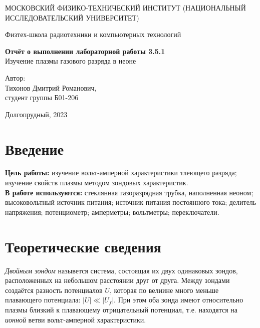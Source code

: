 \documentclass[a4paper, 12pt]{article}
\begin{document}
    \begin{titlepage}
	\begin{center}
            {\large МОСКОВСКИЙ ФИЗИКО-ТЕХНИЧЕСКИЙ ИНСТИТУТ (НАЦИОНАЛЬНЫЙ ИССЛЕДОВАТЕЛЬСКИЙ УНИВЕРСИТЕТ)}
	\end{center}
 
	\begin{center}
		{\large Физтех-школа радиотехники и компьютерных технологий}
	\end{center}
	
	\vspace{8cm}
	{\LARGE
		\begin{center}
                {\bf Отчёт о выполнении лабораторной работы 3.5.1}\\
                Изучение плазмы газового разряда в неоне
		\end{center}
	}
	\vspace{5cm}
	\begin{flushright}
		{\Large Автор:\\ Тихонов Дмитрий Романович, \\
			\vspace{0.2cm}
			студент группы Б01-206}
	\end{flushright}
	\vspace{5cm}
	\begin{center}
		\Large Долгопрудный, 2023
	\end{center}
    \end{titlepage}


    \section{Введение}

    \noindent \textbf{Цель работы:} изучение вольт-амперной характеристики тлеющего разряда; изучение свойств плазмы методом зондовых характеристик. \\

    \noindent \textbf{В работе используются:} стеклянная газоразрядная трубка, наполненная неоном; высоковольтный источник питания; источник питания постоянного тока; делитель напряжения; потенциометр; амперметры; вольтметры; переключатели.
    
    \section{Теоретические сведения}

    \textit{Двойным зондом} назывется система, состоящая их двух одинаковых зондов, расположенных на небольшом расстоянии друг от друга. Между зондами создаётся разность потенциалов $U$, которая по велиине много меньше плавающего потенциала: $\left|U\right|\ll\left|U_f\right|$. При этом оба зонда имеют относительно плазмы близкий к плавающему отрицательный потенциал, т.е. находятся на \textit{ионной} ветви вольт-амперной характеристики.
\end{document}
